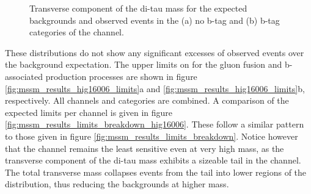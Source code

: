 \begin{figure}[h!]
\begin{center}
\end{center}
\caption[Transverse component of the di-tau mass for the expected backgrounds
and observed events in the no b-tag and b-tag cateogires of the \emu channel.]{Transverse component of the di-tau mass for the expected backgrounds and
observed events in the (a) no b-tag and (b) b-tag categories of the \emu channel.}
\label{fig:mssm_hig16006_mtsv_em}
\end{figure}

These distributions do not show any significant excesses of observed events over
the background expectation. The upper limits
on \xsbr for the gluon fusion and b-associated production
processes are shown in figure \ref{fig:mssm_results_hig16006_limits}a
and \ref{fig:mssm_results_hig16006_limits}b, respectively. All channels and categories are combined. A comparison of
the expected limits per channel is given in figure \ref{fig:mssm_results_limits_breakdown_hig16006}.
These follow a similar pattern to those given in figure \ref{fig:mssm_results_limits_breakdown}. Notice
however that the \emu channel remains the least sensitive even at very high mass, as the
transverse component of the di-tau mass exhibits a sizeable \ttbar tail in the \emu channel. The total
transverse mass collapses events from the tail into lower regions of the distribution, thus reducing the backgrounds
at higher mass.

